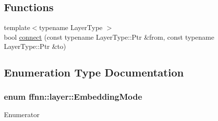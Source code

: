 \subsection*{Functions}
\begin{DoxyCompactItemize}
\item 
{\footnotesize template$<$typename Layer\-Type $>$ }\\bool \hyperlink{namespaceffnn_1_1layer_a33fc9c6c7eb5fbdef14e0aa0db97dd13}{connect} (const typename Layer\-Type\-::\-Ptr \&from, const typename Layer\-Type\-::\-Ptr \&to)
\end{DoxyCompactItemize}


\subsection{Enumeration Type Documentation}
\hypertarget{namespaceffnn_1_1layer_a254f16beba4fb335d935e9b43bb9e69a}{
\subsubsection[{Embedding\-Mode}]{\setlength{\rightskip}{0pt plus 5cm}enum {\bf ffnn\-::layer\-::\-Embedding\-Mode}}}\label{namespaceffnn_1_1layer_a254f16beba4fb335d935e9b43bb9e69a}
\begin{Desc}
\item[Enumerator]\par
\begin{description}
\item[{\em 
\hypertarget{namespaceffnn_1_1layer_a254f16beba4fb335d935e9b43bb9e69aa91eb0d1f175a08e2b2991cae348c827d}{Row\-Embedding}\label{namespaceffnn_1_1layer_a254f16beba4fb335d935e9b43bb9e69aa91eb0d1f175a08e2b2991cae348c827d}
}]\item[{\em 
\hypertarget{namespaceffnn_1_1layer_a254f16beba4fb335d935e9b43bb9e69aa42ac01b35d45fd60256ef5008c96c049}{Col\-Embedding}\label{namespaceffnn_1_1layer_a254f16beba4fb335d935e9b43bb9e69aa42ac01b35d45fd60256ef5008c96c049}
}]\end{description}
\end{Desc}


